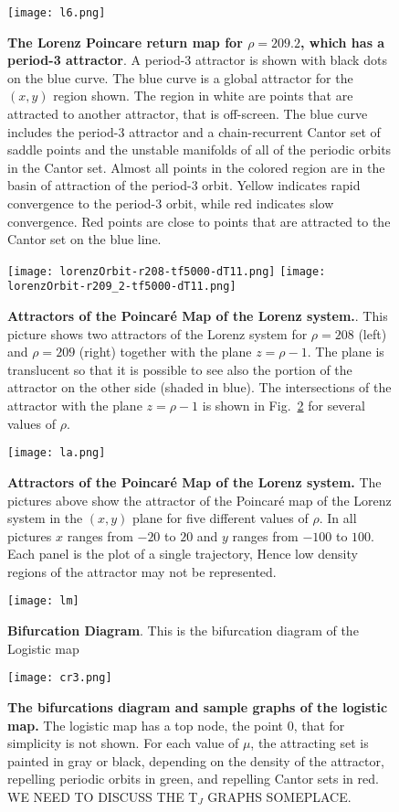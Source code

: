 \begin{figure}
 \centering
 \texttt{[image: l6.png]}
 \caption{{\bf The Lorenz Poincare return map for $\rho=209.2$, which has a period-3 attractor}. A period-3 attractor is shown with black dots on the blue curve. The blue curve is a global attractor for the $(x,y)$ region shown. The region in white are points that are attracted to another attractor, that is off-screen. The blue curve includes the period-3 attractor and a chain-recurrent Cantor set of saddle points and the unstable manifolds of all of the periodic orbits in the Cantor set. Almost all points in the colored region are in the basin of attraction of the period-3 orbit. Yellow indicates rapid convergence to the period-3 orbit, while red indicates slow convergence. Red points are close to points that are attracted to the Cantor set on the blue line.}
 \label{fig:l6}
\end{figure} 
\begin{figure}
 \centering
 \texttt{[image: lorenzOrbit-r208-tf5000-dT11.png]} \texttt{[image: lorenzOrbit-r209\_2-tf5000-dT11.png]}
 \caption{{\bf Attractors of the Poincar\'e Map of the Lorenz system.}. This picture shows two attractors of the Lorenz system for $\rho=208$ (left) and $\rho=209$ (right) together with the plane $z=\rho-1$. The plane is translucent so that it is possible to see also the portion of the attractor on the other side (shaded in blue). The intersections of the attractor with the plane $z=\rho-1$ is shown in Fig.~\ref{fig:l7} for several values of $\rho$. }
 \label{fig:l7}
\end{figure} 
\begin{figure}
 \centering
 \texttt{[image: la.png]}
 \caption{{\bf Attractors of the Poincar\'e Map of the Lorenz system.} The pictures above show the attractor of the Poincar\'e map of the Lorenz system  in the $(x,y)$ plane for five different values of $\rho$. In all pictures $x$ ranges from $-20$ to $20$ and $y$ ranges from $-100$ to $100$. Each panel is the plot of a single trajectory, Hence low density regions of the attractor may not be represented.
 }
 \label{fig:la}
\end{figure} 
\begin{figure}
 \centering
 \texttt{[image: lm]}
 \caption{{\bf Bifurcation Diagram}. This is the bifurcation diagram of the Logistic map}
 \label{fig:lmbd}
\end{figure} 
\begin{figure}
 \centering
 \texttt{[image: cr3.png]}
  \caption{{\bf \allblue The bifurcations diagram and sample graphs of the logistic map.} 
  The logistic map has a top node, the point 0, that for simplicity is not shown.
  For each value of $\mu$, the attracting set is painted in gray or black, depending on the density of the attractor, repelling periodic orbits in green, and repelling Cantor sets in red. 
  \allred WE NEED TO DISCUSS THE T$_J$ GRAPHS SOMEPLACE.
  }
  \label{fig:full}
\end{figure}

